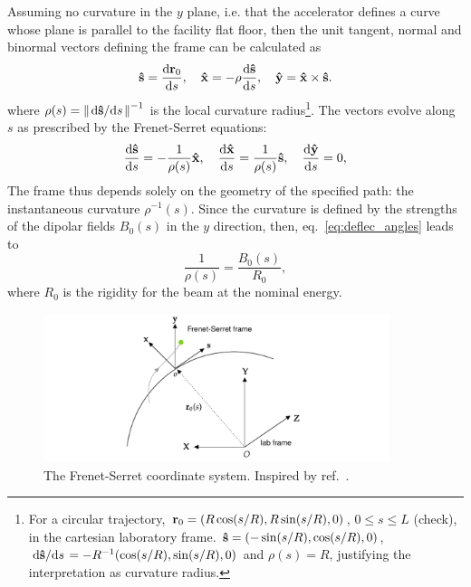 Assuming no curvature in the $y$ plane, i.e. that the accelerator defines a curve whose plane is parallel to the facility flat floor, then the unit tangent, normal and binormal vectors defining the frame can be calculated as \cite{lee_accelerator_2004}
\begin{equation}
\vu{s}=\dv{\vb{r}_{0}}{s}, \quad \vu{x}=-\rho\dv{\vu{s}}{s}, \quad \vu{y} =  \vu{x}\times\vu{s}.
\end{equation}
where $\rho(s) = \norm{\dv*{\vu{s}}{s}}^{-1}$ is the local curvature radius\footnote{For a circular trajectory, $\vb{r}_0 = (R\cos(s/R), R\sin(s/R), 0)$, $ 0\leq s \leq L$ (check), in the cartesian laboratory frame. $\vu{s}=(-\sin(s/R), \cos(s/R), 0)$, $\dv*{\vu{s}}{s} = -R^{-1}(\cos(s/R),\sin(s/R), 0 )$ and $\rho(s)=R$, justifying the interpretation as curvature radius.}. The vectors evolve along $s$ as prescribed by the Frenet-Serret equations:
\begin{equation}
\dv{\vu{s}}{s}=-\frac{1}{\rho(s)}\vu{x}, \quad\dv{\vu{x}}{s}=\frac{1}{\rho(s)}\vu{s}, \quad \dv{\vu{y}}{s}=0,
\end{equation}
The frame thus depends solely on the geometry of the specified path: the instantaneous curvature $\rho^{-1}(s)$. Since the curvature is defined by the strengths of the dipolar fields $B_0(s)$ in the $y$ direction, then, eq.~\eqref{eq:deflec_angles} leads to
    \begin{equation}
        \frac{1}{\rho(s)} = \frac{B_0(s)}{R_0},
        \label{eq:G}
    \end{equation}
where $R_0$ is the rigidity for the beam at the nominal energy.
\begin{figure}[htb]
    \centering
    \includegraphics[width=0.9\textwidth]{Images/frenetserret.pdf}
    \caption{The Frenet-Serret coordinate system. Inspired by ref.~\cite{huang_beam-based_2019}.}
    \label{fig:frenet-serret}
\end{figure}

